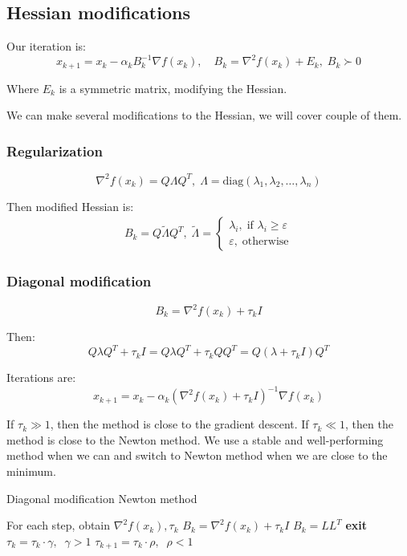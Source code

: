 \subsection{Hessian modifications}

Our iteration is: 
\[
    x_{k+1} = x_k - \alpha_k B^{-1}_k \nabla f(x_k), \quad B_k = \nabla^2 f(x_k) + E_k, \; B_k \succ 0
\]

Where $E_k$ is a symmetric matrix, modifying the Hessian.

We can make several modifications to the Hessian, we will cover couple of them. 

\subsubsection{Regularization}

\[ 
    \nabla^2 f(x_k) = Q \Lambda Q^T, \; \Lambda = \text{diag}(\lambda_1, \lambda_2, \dots, \lambda_n)
\] 

Then modified Hessian is:
\begin{gather*}
    B_k = Q \tilde{\Lambda} Q^T, \; \tilde{\Lambda} = \begin{cases}
        \lambda_i, \; \text{if } \lambda_i \geqslant \varepsilon \\
        \varepsilon, \; \text{otherwise}
    \end{cases}
\end{gather*}

\subsubsection{Diagonal modification}

\[
    B_k = \nabla^2 f(x_k) + \tau_k I 
\]

Then: 
\[ 
    Q \lambda Q^T + \tau_k I = Q \lambda Q^T + \tau_k Q Q^T = Q (\lambda + \tau_k I) Q^T
\]

Iterations are:
\[
    x_{k+1} = x_k - \alpha_k (\nabla^2 f(x_k) + \tau_k I)^{-1} \nabla f(x_k)
\]

If $\tau_k \gg 1$, then the method is close to the gradient descent. If $\tau_k \ll 1$, then the method is close to the Newton method. We use a stable and well-performing method when we can and switch to Newton method when we are close to the minimum.

\begin{algorithm}
    \caption{Diagonal modification Newton method}
    \begin{algorithmic}[1]
    \State For each step, obtain $\nabla^2 f(x_k), \tau_k$
        \State $B_k = \nabla^2 f(x_k) + \tau_k I$
        \State $B_k = L L^T$
            \State \textbf{exit}
        \EndIf
        \State $\tau_k = \tau_k \cdot \gamma, \;\; \gamma > 1$
    \EndWhile
    \State $\tau_{k+1} = \tau_k \cdot \rho, \;\; \rho < 1$
\end{algorithmic}
\end{algorithm}

